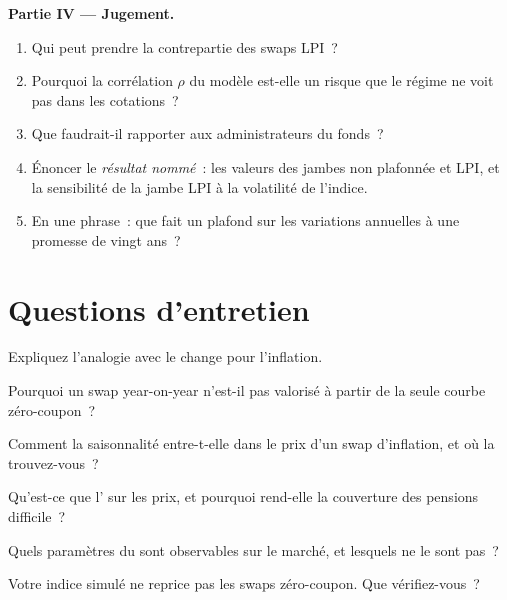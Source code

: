 \begin{problem}
\medskip\noindent\textbf{Partie IV --- Jugement.}
\begin{enumerate}[resume]
\item Qui peut prendre la contrepartie des swaps LPI~?
\item Pourquoi la corrélation $\rho$ du modèle est-elle un risque que le régime ne voit pas dans les cotations~?
\item Que faudrait-il rapporter aux administrateurs du fonds~?
\item Énoncer le \emph{résultat nommé}~: les valeurs des jambes non plafonnée et LPI, et la
sensibilité de la jambe LPI à la volatilité de l'indice.
\item En une phrase~: que fait un plafond sur les variations annuelles à une promesse de vingt ans~?
\end{enumerate}
\end{problem}

\section{Questions d'entretien}

\begin{interviewq}\label{iq:rc:inflation-derivatives:1}
Expliquez l'analogie avec le change pour l'inflation.
\end{interviewq}

\begin{interviewq}\label{iq:rc:inflation-derivatives:2}
Pourquoi un swap year-on-year n'est-il pas valorisé à partir de la seule courbe zéro-coupon~?
\end{interviewq}

\begin{interviewq}\label{iq:rc:inflation-derivatives:3}
Comment la saisonnalité entre-t-elle dans le prix d'un swap d'inflation, et où la trouvez-vous~?
\end{interviewq}

\begin{interviewq}\label{iq:rc:inflation-derivatives:4}
Qu'est-ce que l' sur les prix, et pourquoi rend-elle la couverture des pensions difficile~?
\end{interviewq}

\begin{interviewq}\label{iq:rc:inflation-derivatives:5}
Quels paramètres du  sont observables sur le marché, et lesquels
ne le sont pas~?
\end{interviewq}

\begin{interviewq}\label{iq:rc:inflation-derivatives:6}
Votre indice simulé ne reprice pas les swaps zéro-coupon. Que vérifiez-vous~?
\end{interviewq}
